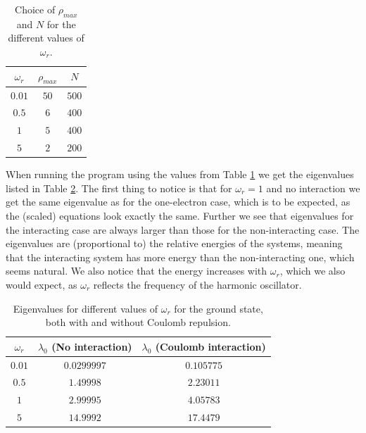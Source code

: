 \documentclass[12pt, a4paper]{article}
\begin{document}
\begin{table}[ht!]
\begin{center}
\caption{Choice of $\rho_{max}$ and $N$ for the different values of $\omega_r$.}
\label{tab:rho_and_N}
\begin{tabular}{ccc} \hline \hline  
$\omega_r$ & $\rho_{max}$ & $N$ \\ \hline
$0.01$ & $50$ & $500$ \\
$0.5$  & $6$  & $400$ \\
$1$    & $5$  & $400$ \\
$5$    & $2$  & $200$ \\ \hline\hline
\end{tabular}
\end{center}
\end{table} 

When running the program using the values from Table \ref{tab:rho_and_N} we get the eigenvalues listed 
in Table \ref{tab:eigenvalues_2p}. The first thing to notice is that for $\omega_r=1$ and no interaction 
we get the same eigenvalue as for the one-electron case, which is to be expected, as the (scaled) 
equations look exactly the same. Further we see that eigenvalues for the interacting case are always 
larger than those for the non-interacting case. The eigenvalues are (proportional to) the relative 
energies of the systems, meaning that the interacting system has more energy than the non-interacting 
one, which seems natural. We also notice that the energy increases with $\omega_r$, which we also would 
expect, as $\omega_r$ reflects the frequency of the harmonic oscillator.     
                                                                                                           
\begin{table}[ht!]
\begin{center}
\caption{Eigenvalues for different values of $\omega_r$ for the ground state, both with and 
without Coulomb repulsion.}
\label{tab:eigenvalues_2p}
\begin{tabular}{ccc} \hline \hline
$\omega_r$ & $\lambda_0$ (No interaction) & $\lambda_0$ (Coulomb interaction) \\ \hline
$0.01$ & $0.0299997$ & $0.105775$ \\
$0.5$  & $1.49998$   & $2.23011$  \\
$1$    & $2.99995$   & $4.05783$  \\
$5$    & $14.9992$   & $17.4479$  \\ \hline \hline
\end{tabular}
\end{center}
\end{table}
\end{document}
